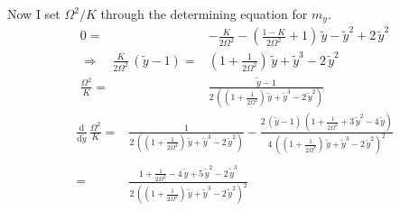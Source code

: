 \documentclass{article}
\begin{document}
Now I set $\Omega^2/K$ through the determining equation for $m_y$.
\begin{align*}
    0=&-\frac{K}{2\Omega^2}-\left( \frac{1-K}{2\Omega^2} +1\right)\,\tilde{y}-\tilde{y}^2+2\,\tilde{y}^2\\
    \Rightarrow\quad \frac{K}{2\Omega^2}\,(\tilde{y}-1)=&(1+\frac{1}{2\Omega^2})\,\tilde{y}+\tilde{y}^3-2\,\tilde{y}^2\\
    \frac{\Omega^2}{K}=&\frac{\tilde{y}-1}{2\,\left(  (1+\frac{1}{2\Omega^2})\,\tilde{y}+\tilde{y}^3-2\,\tilde{y}^2\right)}
\end{align*}
\begin{align*}
    \frac{\text{d}}{\text{d}\tilde{y}}\,\frac{\Omega^2}{K}=&\frac{1}{2\,\left(  (1+\frac{1}{2\Omega^2})\,\tilde{y}+\tilde{y}^3-2\,\tilde{y}^2\right)}-\frac{2\,(\tilde{y}-1)\,(1+\frac{1}{2\Omega^2}+3\,\tilde{y}^2-4\,\tilde{y})}{4\,\left(  (1+\frac{1}{2\Omega^2})\,\tilde{y}+\tilde{y}^3-2\,\tilde{y}^2\right)^2}\\\\
    =&\frac{1+\frac{1}{2\Omega^2}-4\,\tilde{y}+5\,\tilde{y}^2-2\,\tilde{y}^3}{2\,\left(  (1+\frac{1}{2\Omega^2})\,\tilde{y}+\tilde{y}^3-2\,\tilde{y}^2\right)^2}
\end{align*}
\end{document}
